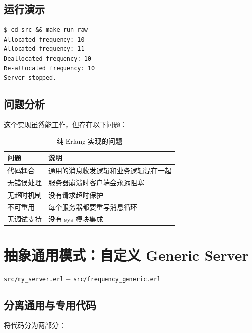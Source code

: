 \documentclass[a4paper,11pt]{article}
\begin{document}
\subsection{运行演示}

\begin{lstlisting}[style=shellstyle, caption={运行纯 Erlang 版本}]
$ cd src && make run_raw
Allocated frequency: 10
Allocated frequency: 11
Deallocated frequency: 10
Re-allocated frequency: 10
Server stopped.
\end{lstlisting}

\subsection{问题分析}

这个实现虽然能工作，但存在以下问题：

\begin{table}[H]
\centering
\begin{tabular}{@{}ll@{}}
\toprule
\textbf{问题} & \textbf{说明} \\
\midrule
代码耦合 & 通用的消息收发逻辑和业务逻辑混在一起 \\
无错误处理 & 服务器崩溃时客户端会永远阻塞 \\
无超时机制 & 没有请求超时保护 \\
不可重用 & 每个服务器都要重写消息循环 \\
无调试支持 & 没有 sys 模块集成 \\
\bottomrule
\end{tabular}
\caption{纯 Erlang 实现的问题}
\label{tab:raw-problems}
\end{table}


\section{抽象通用模式：自定义 Generic Server}

\begin{notebox}[源码文件]
\texttt{src/my\_server.erl} + \texttt{src/frequency\_generic.erl}
\end{notebox}

\subsection{分离通用与专用代码}

将代码分为两部分：
\end{document}
